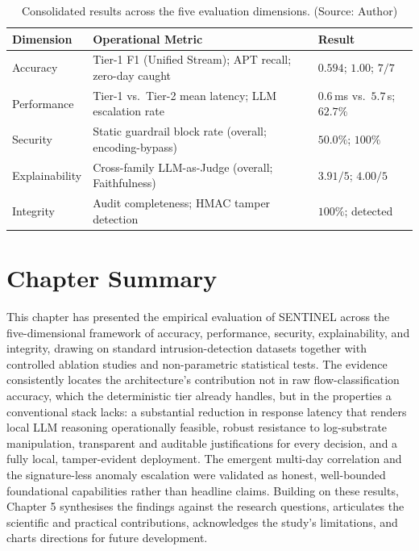 \begin{table}[!htbp]
    \centering
    \caption{Consolidated results across the five evaluation dimensions. (Source: Author)}
    \label{tab:5d_summary}
    \begin{tabular}{|>{\raggedright\arraybackslash}p{}|>{\raggedright\arraybackslash}p{}|>{\raggedright\arraybackslash}p{}|}
        \hline
        \textbf{Dimension} & \textbf{Operational Metric} & \textbf{Result} \\
        \hline
        Accuracy & Tier-1 F1 (Unified Stream); APT recall; zero-day caught & $0.594$; $1.00$; $7/7$ \\
        \hline
        Performance & Tier-1 vs.\ Tier-2 mean latency; LLM escalation rate & $0.6$\,ms vs.\ $5.7$\,s; $62.7\%$ \\
        \hline
        Security & Static guardrail block rate (overall; encoding-bypass) & $50.0\%$; $100\%$ \\
        \hline
        Explainability & Cross-family LLM-as-Judge (overall; Faithfulness) & $3.91/5$; $4.00/5$ \\
        \hline
        Integrity & Audit completeness; HMAC tamper detection & $100\%$; detected \\
        \hline
    \end{tabular}
\end{table}

\section{Chapter Summary}
This chapter has presented the empirical evaluation of SENTINEL across the five-dimensional framework of accuracy, performance, security, explainability, and integrity, drawing on standard intrusion-detection datasets together with controlled ablation studies and non-parametric statistical tests. The evidence consistently locates the architecture's contribution not in raw flow-classification accuracy, which the deterministic tier already handles, but in the properties a conventional stack lacks: a substantial reduction in response latency that renders local LLM reasoning operationally feasible, robust resistance to log-substrate manipulation, transparent and auditable justifications for every decision, and a fully local, tamper-evident deployment. The emergent multi-day correlation and the signature-less anomaly escalation were validated as honest, well-bounded foundational capabilities rather than headline claims. Building on these results, Chapter 5 synthesises the findings against the research questions, articulates the scientific and practical contributions, acknowledges the study's limitations, and charts directions for future development.
